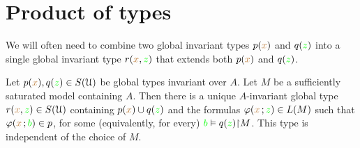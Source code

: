 \section{Product of types}

We will often need to combine two global invariant types $p({\color{brown} x})$ and $q({\color{green} z})$ into a single global invariant type $r({\color{brown} x},{\color{green} z})$ that extends both $p({\color{brown} x})$ and $q({\color{green} z})$.

\begin{fact}
  Let $p({\color{brown} x}),q({\color{green} z})\in S(\EuScript U)$ be global types invariant over $A$.
  Let $M$ be a sufficiently  saturated model containing $A$.
  Then there is a unique $A$-invariant global type $r({\color{brown} x},{\color{green} z})\in S(\EuScript U)$ containing $p({\color{brown} x})\cup q({\color{green} z})$ and the formulas $\varphi({\color{brown} x}\,;{\color{green} z})\in L(M)$ such that $\varphi({\color{brown} x}\,;{\color{green} b})\in p$, for some (equivalently, for every) ${\color{green} b}\vDash q({\color{green} z}){\restriction} M$.
  This type is independent of the choice of $M$.
\end{fact}


